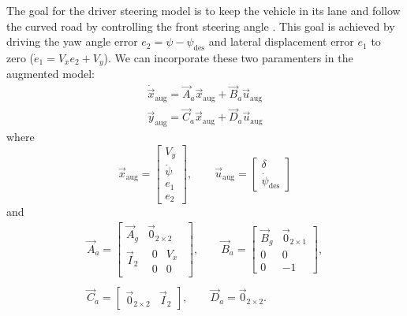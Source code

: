 The goal for the driver steering model is to keep the vehicle in its lane and follow the curved road by controlling the front steering angle . This goal is achieved by driving the yaw angle error $e_2 = \psi -\psi_{\text{des}}$ and lateral displacement error $e_1$ to zero ($\dot{e}_1 = V_xe_2+V_y$). We can incorporate these two paramenters in the augmented model:
\begin{equation}
\label{eqn:lateral_dynamics_augmented_model}
\begin{array}{ll}
\dot{\vec{x}}_{\text{aug}} =\vec{A}_a \vec{x}_{\text{aug}}+ \vec{B}_a \vec{u}_{\text{aug}}\\
\vec{y}_{\text{aug}} = \vec{C}_a \vec{x}_{\text{aug}} + \vec{D}_a \vec{u}_{\text{aug}}
\end{array}
\end{equation}
where
\begin{equation}
\vec{x}_{\text{aug}} = \begin{bmatrix}
V_y\\\dot{\psi}\\e_1\\e_2
\end{bmatrix},
\qquad
\vec{u}_{\text{aug}} = 
\begin{bmatrix}
\delta\\\dot{\psi}_{\text{des}}
\end{bmatrix}
\end{equation}
and
\begin{equation}
\begin{array}{cc} 
\vec{A}_a=\begin{bmatrix}
\vec{A}_g&\vec{0}_{2\times2}\\
\vec{I}_2&\begin{matrix}
0&V_x\\
0&0
\end{matrix}
\end{bmatrix},
\qquad
\vec{B}_a=\begin{bmatrix}
\vec{B}_g&\vec{0}_{2\times1}\\
0&0\\
0&-1
\end{bmatrix},
\\\\
\vec{C}_a=\begin{bmatrix}
\vec{0}_{2\times2}&\vec{I}_2
\end{bmatrix}, 
\qquad
\vec{D}_a=
\vec{0}_{2\times2}. 
\end{array}
\end{equation}

